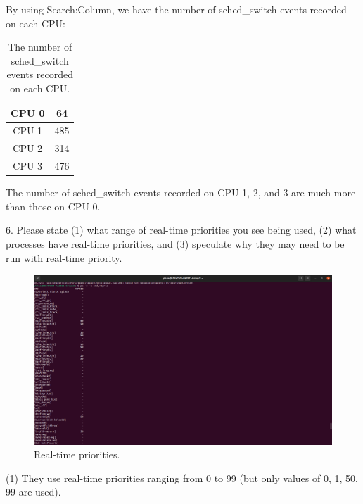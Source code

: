 \documentclass[a4paper]{article}
\begin{document}
By using Search:Column, we have the number of sched\_switch events recorded on each CPU:
\begin{table}[H]
    \centering
    \begin{tabular}{|c|c|}
        \hline
        CPU 0&64\\
        \hline
        CPU 1&485\\
        \hline
        CPU 2&314\\
        \hline
        CPU 3&476\\
        \hline
    \end{tabular}
    \caption{The number of sched\_switch events recorded on each CPU.}
\end{table}
The number of sched\_switch events recorded on CPU 1, 2, and 3 are much more than those on CPU 0.

6. Please state (1) what range of real-time priorities you see being used, (2) what processes have real-time priorities, and (3) speculate why they may need to be run with real-time priority.
\begin{figure}[H]
    \centering
    \includegraphics[width=1\textwidth]{7.png}
    \caption{Real-time priorities.}
\end{figure}
(1) They use real-time priorities ranging from 0 to 99 (but only values of 0, 1, 50, 99 are used).
\end{document}
